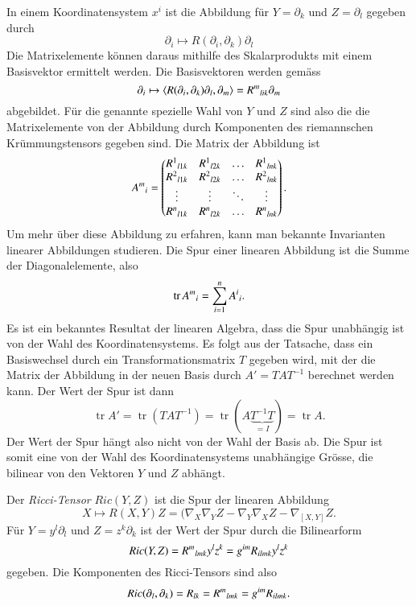 In einem Koordinatensystem $x^i$ ist die
Abbildung für $Y=\partial_k$ und $Z=\partial_l$  gegeben durch
\[
\partial_i
\mapsto
R(\partial_i,\partial_k)\partial_l
\]
Die Matrixelemente können daraus mithilfe des Skalarprodukts mit
einem Basisvektor ermittelt werden.
Die Basisvektoren werden gemäss
\[
\partial_i
\mapsto
\langle
R(\partial_i,\partial_k)\partial_l,
\partial_m
\rangle
=
R^{m}\mathstrut_{lik}\partial_m
\]
abgebildet.
Für die genannte spezielle Wahl von $Y$ und $Z$ sind also die 
die Matrixelemente von der Abbildung durch Komponenten des
riemannschen Krümmungstensors gegeben sind.
Die Matrix der Abbildung ist
\[
A^m\mathstrut_i
=
\begin{pmatrix}
R^1\mathstrut_{l1k} & R^1\mathstrut_{l2k} & \dots  & R^1\mathstrut_{lnk} \\
R^2\mathstrut_{l1k} & R^2\mathstrut_{l2k} & \dots  & R^2\mathstrut_{lnk} \\
\vdots              & \vdots              & \ddots & \vdots              \\
R^n\mathstrut_{l1k} & R^n\mathstrut_{l2k} & \dots  & R^n\mathstrut_{lnk} 
\end{pmatrix}.
\]
Um mehr über diese Abbildung zu erfahren, kann man bekannte
Invarianten linearer Abbildungen studieren.
Die Spur einer linearen Abbildung ist die Summe der Diagonalelemente,
also
\[
\operatorname{tr} A^m\mathstrut_i
=
\sum_{i=1}^n A^i\mathstrut_i.
\]
Es ist ein bekanntes Resultat der linearen Algebra, dass die Spur
unabhängig ist von der Wahl des Koordinatensystems.
Es folgt aus der Tatsache, dass ein Basiswechsel durch ein
Transformationsmatrix $T$ gegeben wird, mit der die Matrix der
Abbildung in der neuen Basis durch $A'=TAT^{-1}$ berechnet
werden kann.
Der Wert der Spur ist dann
\[
\operatorname{tr} A'
=
\operatorname{tr}(TAT^{-1})
=
\operatorname{tr}(A\underbrace{T^{-1}T}_{\displaystyle=I})
=
\operatorname{tr}A.
\]
Der Wert der Spur hängt also nicht von der Wahl der Basis ab.
Die Spur ist somit eine von der Wahl des Koordinatensystems
unabhängige Grösse, die bilinear von den Vektoren $Y$ und $Z$
abhängt.

\begin{definition}
Der \emph{Ricci-Tensor} $Ric(Y,Z)$ ist die Spur der linearen Abbildung
\[
X \mapsto R(X,Y)Z = (\nabla_X\nabla_YZ-\nabla_Y\nabla_XZ-\nabla_{[X,Y]}Z.
\]
Für $Y=y^l\partial_l$ und $Z=z^k\partial_k$ ist der Wert der Spur
durch die Bilinearform
\[
\textit{Ric}(Y,Z)
=
R^m\mathstrut_{lmk} y^lz^k
=
g^{im}
R_{ilmk}y^lz^k
\]
gegeben.
%
Die Komponenten des Ricci-Tensors sind also
\[
\textit{Ric}(\partial_l,\partial_k)
=
R_{lk}
=
R^m\mathstrut_{lmk}
=
g^{im}
R_{ilmk}.
\]
\end{definition}

